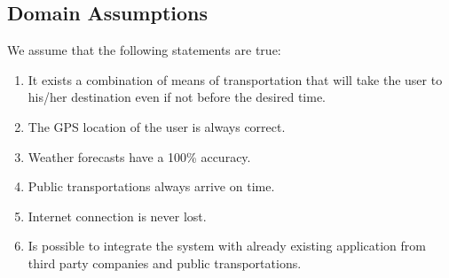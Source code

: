 \subsection{Domain Assumptions}
We assume that the following statements are true:
\begin{enumerate}
\item It exists a combination of means of transportation that will take the user to his/her destination even if not before the desired time.
\item The GPS location of the user is always correct.
\item Weather forecasts have a 100\% accuracy.
\item Public transportations always arrive on time.
\item Internet connection is never lost.
\item Is possible to integrate the system with already existing application from third party companies and public transportations.
\end{enumerate}